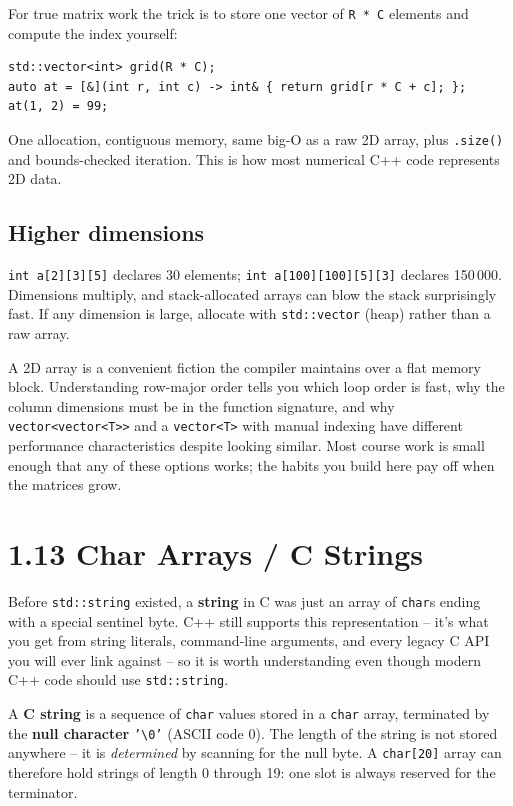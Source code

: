 \documentclass[11pt]{article}
\begin{document}
\begin{ideabox}
For true matrix work the trick is to store one vector of
\texttt{R * C} elements and compute the index yourself:
\begin{verbatim}
std::vector<int> grid(R * C);
auto at = [&](int r, int c) -> int& { return grid[r * C + c]; };
at(1, 2) = 99;
\end{verbatim}
One allocation, contiguous memory, same big-O as a raw 2D array, plus
\texttt{.size()} and bounds-checked iteration. This is how most
numerical C++ code represents 2D data.
\end{ideabox}

\subsection{Higher dimensions}

\texttt{int a[2][3][5]} declares 30 elements; \texttt{int a[100][100][5][3]}
declares 150\,000. Dimensions multiply, and stack-allocated arrays can
blow the stack surprisingly fast. If any dimension is large, allocate
with \texttt{std::vector} (heap) rather than a raw array.

\begin{ideabox}
A 2D array is a convenient fiction the compiler maintains over a flat
memory block. Understanding row-major order tells you which loop order
is fast, why the column dimensions must be in the function signature,
and why \texttt{vector<vector<T>>} and a \texttt{vector<T>} with manual
indexing have different performance characteristics despite looking
similar. Most course work is small enough that any of these options
works; the habits you build here pay off when the matrices grow.
\end{ideabox}

\section{1.13 Char Arrays / C Strings}

Before \texttt{std::string} existed, a \textbf{string} in C was just an
array of \texttt{char}s ending with a special sentinel byte. C++ still
supports this representation -- it's what you get from string literals,
command-line arguments, and every legacy C API you will ever link
against -- so it is worth understanding even though modern C++ code
should use \texttt{std::string}.

\begin{defnbox}
A \textbf{C string} is a sequence of \texttt{char} values stored in a
\texttt{char} array, terminated by the \textbf{null character}
\texttt{'\textbackslash0'} (ASCII code 0). The length of the string is
not stored anywhere -- it is \emph{determined} by scanning for the null
byte. A \texttt{char[20]} array can therefore hold strings of length 0
through 19: one slot is always reserved for the terminator.
\end{defnbox}
\end{document}

